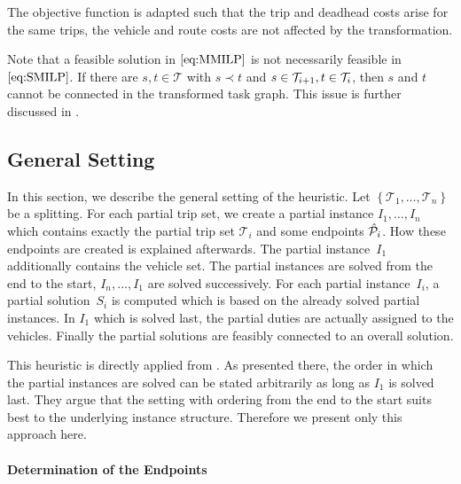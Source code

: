 The objective function is adapted such that the trip and deadhead costs arise for the same trips, the vehicle and route costs are not affected by the transformation.

\begin{remark}

Note that a feasible solution in $\eqref{eq:MMILP}$ is not necessarily feasible in $\eqref{eq:SMILP}$. If there are ${s,t\in\mathcal{T}}$ with ${s\prec t}$ and ${s\in\mathcal{T}_{i+1}}, {t\in\mathcal{T}_i}$, then $s$ and $t$ cannot be connected in the transformed task graph. This issue is further discussed in .

\end{remark}


\subsection{General Setting}
\label{sec:general_setting}

In this section, we describe the general setting of the heuristic. Let $\left\{\mathcal{T}_1,\dots,\mathcal{T}_n\right\}$ be a splitting. For each partial trip set, we create a partial instance ${I_1,\dots,I_n}$ which contains exactly the partial trip set $\mathcal{T}_i$ and some endpoints $\hat{\mathcal{P}}_i$. How these endpoints are created is explained afterwards. The partial instance~$I_1$ additionally contains the vehicle set. The partial instances are solved from the end to the start, \ie ${I_n,\dots,I_1}$ are solved successively. For each partial instance~$I_i$, a partial solution~$S_i$ is computed which is based on the already solved partial instances. In $I_1$ which is solved last, the partial duties are actually assigned to the vehicles. Finally the partial solutions are feasibly connected to an overall solution.

This heuristic is directly applied from \cite[Sec.~10.4]{Knoll}. As presented there, the order in which the partial instances are solved can be stated arbitrarily as long as $I_1$ is solved last. They argue that the setting with ordering from the end to the start suits best to the underlying instance structure. Therefore we present only this approach here.

\paragraph{Determination of the Endpoints} \parfill

